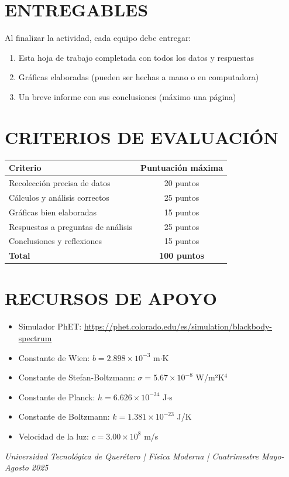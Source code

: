 \documentclass[12pt,a4paper]{article}
\begin{document}
	\section*{ENTREGABLES}
	
	Al finalizar la actividad, cada equipo debe entregar:
	\begin{enumerate}
		\item Esta hoja de trabajo completada con todos los datos y respuestas
		\item Gráficas elaboradas (pueden ser hechas a mano o en computadora)
		\item Un breve informe con sus conclusiones (máximo una página)
	\end{enumerate}
	
	\section*{CRITERIOS DE EVALUACIÓN}
	
	\begin{center}
		\begin{tabular}{|l|c|}
			\hline
			\textbf{Criterio} & \textbf{Puntuación máxima} \\
			\hline
			Recolección precisa de datos & 20 puntos \\
			\hline
			Cálculos y análisis correctos & 25 puntos \\
			\hline
			Gráficas bien elaboradas & 15 puntos \\
			\hline
			Respuestas a preguntas de análisis & 25 puntos \\
			\hline
			Conclusiones y reflexiones & 15 puntos \\
			\hline
			\textbf{Total} & \textbf{100 puntos} \\
			\hline
		\end{tabular}
	\end{center}
	
	\section*{RECURSOS DE APOYO}
	
	\begin{itemize}
		\item Simulador PhET: \url{https://phet.colorado.edu/es/simulation/blackbody-spectrum}
		\item Constante de Wien: $b = 2.898 \times 10^{-3}$ m$\cdot$K
		\item Constante de Stefan-Boltzmann: $\sigma = 5.67 \times 10^{-8}$ W/m²K$^4$
		\item Constante de Planck: $h = 6.626 \times 10^{-34}$ J$\cdot$s
		\item Constante de Boltzmann: $k = 1.381 \times 10^{-23}$ J/K
		\item Velocidad de la luz: $c = 3.00 \times 10^{8}$ m/s
	\end{itemize}
	
	\vfill
	
	\begin{center}
		\textcolor{uteqgray}{\textit{Universidad Tecnológica de Querétaro | Física Moderna | Cuatrimestre Mayo-Agosto 2025}}
	\end{center}
	
\end{document}

